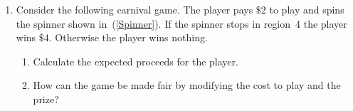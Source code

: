 \documentclass[12pt]{article}
\begin{document}
\begin{enumerate}
\item Consider the following carnival game.
The player pays $\$2$ to play and spins the spinner
shown in~(\ref{Spinner}). If the spinner stops in region~4
the player wins $\$4$. Otherwise the player wins nothing.
\begin{enumerate}
\item Calculate the expected proceeds for the player.
\item How can the game be made fair by modifying the
cost to play and the prize?
\end{enumerate}
\end{enumerate}
\end{document}
